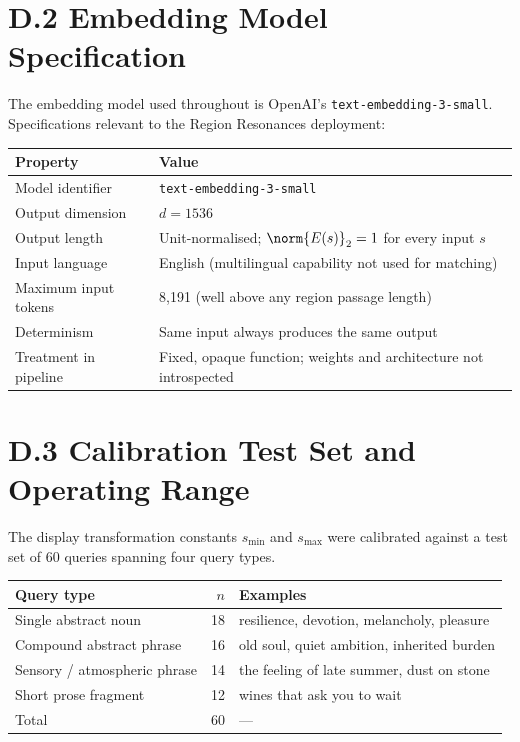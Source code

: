 \documentclass[11pt]{article}
\begin{document}
\section*{D.2 Embedding Model Specification}
The embedding model used throughout is OpenAI's \texttt{text-embedding-3-small}. Specifications relevant to the Region Resonances deployment:

\begin{center}
\begin{tabular}{@{}lp{8.5cm}@{}}
\toprule
Property & Value \\
\midrule
Model identifier        & \texttt{text-embedding-3-small} \\
Output dimension        & $d = 1536$ \\
Output length           & Unit-normalised; $\norm{E(s)}_2 = 1$ for every input $s$ \\
Input language          & English (multilingual capability not used for matching) \\
Maximum input tokens    & 8{,}191 (well above any region passage length) \\
Determinism             & Same input always produces the same output \\
Treatment in pipeline   & Fixed, opaque function; weights and architecture not introspected \\
\bottomrule
\end{tabular}
\end{center}

\section*{D.3 Calibration Test Set and Operating Range}
The display transformation constants $s_{\min}$ and $s_{\max}$ were calibrated against a test set of 60 queries spanning four query types.

\begin{center}
\begin{tabular}{@{}lrp{8.0cm}@{}}
\toprule
Query type & $n$ & Examples \\
\midrule
Single abstract noun        & 18 & resilience, devotion, melancholy, pleasure \\
Compound abstract phrase    & 16 & old soul, quiet ambition, inherited burden \\
Sensory / atmospheric phrase & 14 & the feeling of late summer, dust on stone \\
Short prose fragment         & 12 & wines that ask you to wait \\
\midrule
Total                        & 60 & --- \\
\bottomrule
\end{tabular}
\end{center}
\end{document}
